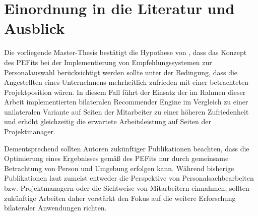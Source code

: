 \section{Einordnung in die Literatur und Ausblick}
\label{ch:diskussion:einordnung}
Die vorliegende Master-Thesis bestätigt die Hypothese von \textcite{malinowski:2008}, dass das Konzept des \acp{PEFit} bei der Implementierung von Empfehlungssystemen zur Personalauswahl berücksichtigt werden sollte unter der Bedingung, dass die Angestellten eines Unternehmens mehrheitlich zufrieden mit einer betrachteten Projektposition wären. In diesem Fall führt der Einsatz der im Rahmen dieser Arbeit implementierten bilateralen Recommender Engine im Vergleich zu einer unilateralen Variante auf Seiten der Mitarbeiter zu einer höheren Zufriedenheit und erhöht gleichzeitig die erwartete Arbeitsleistung auf Seiten der Projektmanager.

Dementsprechend sollten Autoren zukünftiger Publikationen beachten, dass die Optimierung eines Ergebnisses gemäß des \acp{PEFit} nur durch gemeinsame Betrachtung von Person und Umgebung erfolgen kann. Während bisherige Publikationen laut \textcite{malinowski:2008} zumeist entweder die Perspektive von Personalsachbearbeiten bzw. Projektmanagern oder die Sichtweise von Mitarbeitern einnahmen, sollten zukünftige Arbeiten daher verstärkt den Fokus auf die weitere Erforschung bilateraler Anwendungen richten.
